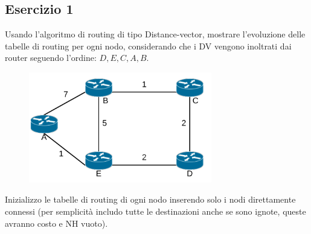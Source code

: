 \documentclass[10pt]{article}
\begin{document}
	\subsection{Esercizio 1}
	Usando l'algoritmo di routing di tipo Distance-vector, mostrare l'evoluzione delle tabelle di routing per ogni nodo, considerando che i DV vengono inoltrati dai router seguendo l'ordine: ${D,E,C,A,B}$.
	\begin{figure}[h!]
	\centering
	\includegraphics[width=8cm]{esercizio1}
	\end{figure}
	\newline
	Inizializzo le tabelle di routing di ogni nodo inserendo solo i nodi direttamente connessi (per semplicità includo tutte le destinazioni anche se sono ignote, queste avranno costo e NH vuoto).
\end{document}
